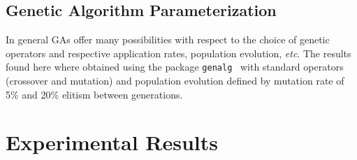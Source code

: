 \documentclass[review,preprint]{elsarticle}
\newcommand{\revised}[2]{}
\begin{document}
\subsection{Genetic Algorithm Parameterization}

\revised{Please indicate all these values in detail}{We described the parameterization in more detail.}

\revised{You should contrast obtained results in a table.  Results are hard to judge from Fig 3 alone.}{Done that.}

\revised{The number of 250 for iterations seems premature specially when one looks at Fig 4. Stabilize? Really?  This only seems valid in one case of lambda.}{we changed the number of iterations to 2000, way behind stabilization}

In general \acp{GA} offer many possibilities with respect to the choice of genetic operators and respective application rates, population evolution, \emph{etc}. The results found here where obtained using the package \texttt{genalg}~\citep{Willighagen:2012aa} with standard operators (crossover and mutation) and population evolution defined by mutation rate of 5\% and 20\% elitism between generations.

\section{Experimental Results}\label{sec:experimental.results}
\end{document}
